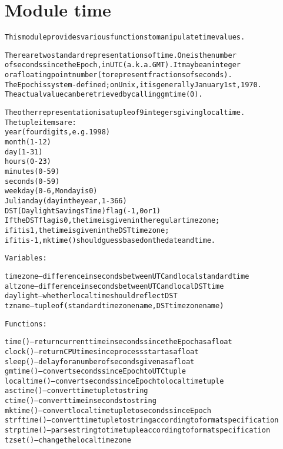 %
%
%


\section{Module time}

    \label{time}
\begin{alltt}
This module provides various functions to manipulate time values.

There are two standard representations of time.  One is the number
of seconds since the Epoch, in UTC (a.k.a. GMT).  It may be an integer
or a floating point number (to represent fractions of seconds).
The Epoch is system-defined; on Unix, it is generally January 1st, 1970.
The actual value can be retrieved by calling gmtime(0).

The other representation is a tuple of 9 integers giving local time.
The tuple items are:
  year (four digits, e.g. 1998)
  month (1-12)
  day (1-31)
  hours (0-23)
  minutes (0-59)
  seconds (0-59)
  weekday (0-6, Monday is 0)
  Julian day (day in the year, 1-366)
  DST (Daylight Savings Time) flag (-1, 0 or 1)
If the DST flag is 0, the time is given in the regular time zone;
if it is 1, the time is given in the DST time zone;
if it is -1, mktime() should guess based on the date and time.

Variables:

timezone -- difference in seconds between UTC and local standard time
altzone -- difference in  seconds between UTC and local DST time
daylight -- whether local time should reflect DST
tzname -- tuple of (standard time zone name, DST time zone name)

Functions:

time() -- return current time in seconds since the Epoch as a float
clock() -- return CPU time since process start as a float
sleep() -- delay for a number of seconds given as a float
gmtime() -- convert seconds since Epoch to UTC tuple
localtime() -- convert seconds since Epoch to local time tuple
asctime() -- convert time tuple to string
ctime() -- convert time in seconds to string
mktime() -- convert local time tuple to seconds since Epoch
strftime() -- convert time tuple to string according to format specification
strptime() -- parse string to time tuple according to format specification
tzset() -- change the local timezone
\end{alltt}


